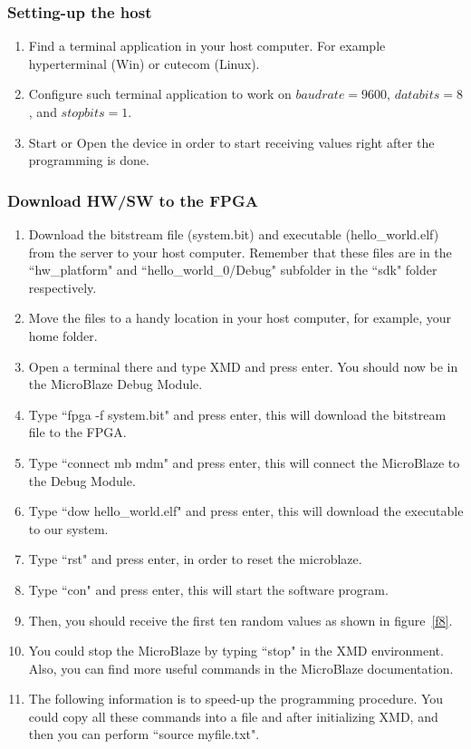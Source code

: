 \subsubsection{Setting-up the host}
\begin{enumerate}
\item Find a terminal application in your host computer. For example hyperterminal (Win) or cutecom (Linux).
\item Configure such terminal application to work on $baud rate=9600$, $data bits=8$, and $stop bits=1$.
\item Start or Open the device in order to start receiving values right after the programming is done.
\end{enumerate}

\subsubsection{Download HW/SW to the FPGA}
\begin{enumerate}
\item Download the bitstream file (system.bit) and executable (hello\_world.elf) from the server to your host computer. Remember that these files are in the ``hw\_platform" and ``hello\_world\_0/Debug" subfolder in the ``sdk" folder respectively.
\item Move the files to a handy location in your host computer, for example, your home folder.
\item Open a terminal there and type XMD and press enter. You should now be in the MicroBlaze Debug Module.
\item Type ``fpga -f system.bit" and press enter, this will download the bitstream file to the FPGA.
\item Type ``connect mb mdm" and press enter, this will connect the MicroBlaze to the Debug Module.
\item Type ``dow hello\_world.elf" and press enter, this will download the executable to our system.
\item Type ``rst" and press enter, in order to reset the microblaze. 
\item Type ``con" and press enter, this will start the software program.
\item Then, you should receive the first ten random values as shown in figure~\ref{f8}.
\item You could stop the MicroBlaze by typing ``stop" in the XMD environment. Also, you can find more useful commands in the MicroBlaze documentation.
\item The following information is to speed-up the programming procedure. You could copy all these commands into a file and after initializing XMD, and then you can perform ``source myfile.txt".
\end{enumerate}

